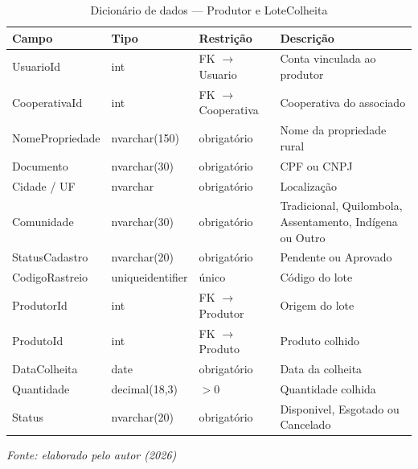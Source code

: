 \begin{table}[H]
  \centering
  \caption{Dicionário de dados --- Produtor e LoteColheita}
  \label{tab:dic-produtor}
  \fontsize{9}{10.5}\selectfont
  \begin{tabular}{L{2.6cm}L{2.6cm}L{4.4cm}L{4.6cm}}
    \toprule
    \textbf{Campo} & \textbf{Tipo} & \textbf{Restrição} & \textbf{Descrição} \\
    \midrule
    UsuarioId & int & FK $\rightarrow$ Usuario & Conta vinculada ao produtor \\
    CooperativaId & int & FK $\rightarrow$ Cooperativa & Cooperativa do associado \\
    NomePropriedade & nvarchar(150) & obrigatório & Nome da propriedade rural \\
    Documento & nvarchar(30) & obrigatório & CPF ou CNPJ \\
    Cidade / UF & nvarchar & obrigatório & Localização \\
    Comunidade & nvarchar(30) & obrigatório & Tradicional, Quilombola,
      Assentamento, Indígena ou Outro \\
    StatusCadastro & nvarchar(20) & obrigatório & Pendente ou Aprovado \\
    \midrule
    CodigoRastreio & uniqueidentifier & único & Código do lote \\
    ProdutorId & int & FK $\rightarrow$ Produtor & Origem do lote \\
    ProdutoId & int & FK $\rightarrow$ Produto & Produto colhido \\
    DataColheita & date & obrigatório & Data da colheita \\
    Quantidade & decimal(18,3) & $> 0$ & Quantidade colhida \\
    Status & nvarchar(20) & obrigatório & Disponivel, Esgotado ou Cancelado \\
    \bottomrule
  \end{tabular}

  \vspace{2pt}
  {\fontsize{9}{10.5}\selectfont\itshape Fonte: elaborado pelo autor (2026)}
\end{table}

